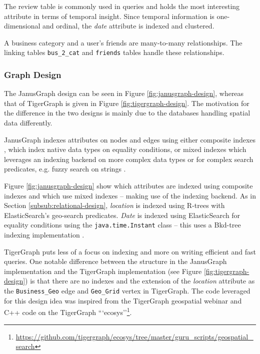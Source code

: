 The review table is commonly used in queries and holds the most interesting attribute in terms of temporal insight. Since temporal information is one-dimensional and ordinal, the \emph{date} attribute is indexed and clustered.

A business category and a user's friends are many-to-many relationships. The linking tables \texttt{bus\_2\_cat} and \texttt{friends} tables handle these relationships.

\subsubsection{Graph Design}

The JanusGraph design can be seen in Figure \ref{fig:janusgraph-design}, whereas that of TigerGraph is given in Figure \ref{fig:tigergraph-design}. The motivation for the difference in the two designs is mainly due to the databases handling spatial data differently.

JanusGraph indexes attributes on nodes and edges using either composite indexes \cite{janusgraph-comp-index}, which index native data types on equality conditions, or mixed indexes which leverages an indexing backend on more complex data types or for complex search predicates, e.g. fuzzy search on strings \cite{janusgraph-mixed-index}.

Figure \ref{fig:janusgraph-design} show which attributes are indexed using composite indexes and which use mixed indexes -- making use of the indexing backend. As in Section \ref{subsub:relational-design}, \emph{location} is indexed using R-trees with ElasticSearch's geo-search predicates. \emph{Date} is indexed using ElasticSearch for equality conditions using the \texttt{java.time.Instant} class -- this uses a Bkd-tree indexing implementation \cite{es-bkdtree-index}.

TigerGraph puts less of a focus on indexing and more on writing efficient and fast queries. One notable difference between the structure in the JanusGraph implementation and the TigerGraph implementation (see Figure \ref{fig:tigergraph-design}) is that there are no indexes and the extension of the \emph{location} attribute as the \texttt{Business\_Geo} edge and \texttt{Geo\_Grid} vertex in TigerGraph. The code leveraged for this design idea was inspired from the TigerGraph geospatial webinar \cite{graphgurus} and C++ code on the TigerGraph ```ecosys''\footnote{\url{https://github.com/tigergraph/ecosys/tree/master/guru\_scripts/geospatial\_search}}.
